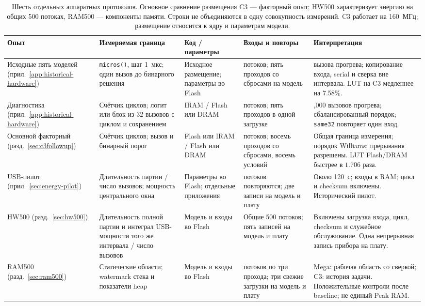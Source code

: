 \begin{table}[!htbp]
\caption{Шесть отдельных аппаратных протоколов. Основное сравнение размещения C3 --- факторный опыт; HW500 характеризует энергию на общих 500 потоках, RAM500 --- компоненты памяти. Строки не объединяются в одну совокупность измерений. C3 работает на 160~МГц; размещение относится к ядру и параметрам модели.}
\label{tab:protocol-map}
\centering\scriptsize\setlength{\tabcolsep}{3pt}
\begin{tabular}{>{\RaggedRight\arraybackslash}p{2.1cm}>{\RaggedRight\arraybackslash}p{3.2cm}>{\RaggedRight\arraybackslash}p{2.4cm}>{\RaggedRight\arraybackslash}p{3.1cm}>{\RaggedRight\arraybackslash}p{4.0cm}}
\toprule
Опыт & Измеряемая граница & Код / параметры & Входы и повторы & Интерпретация\\
\midrule
Исходные пять моделей (прил.~\ref{app:historical-hardware}) & \texttt{micros()}, шаг 1~мкс; один вызов до бинарного решения & Исходное размещение; параметры во Flash & 500 потоков; пять проходов со сбросами на модель & 64 вызова прогрева; копирование входа, serial и сверка вне интервала. LUT на C3 медленнее на 7.58\%.\\
Диагностика (прил.~\ref{app:historical-hardware}) & Счётчик циклов; логит или блок из 32 вызовов с циклом и сохранением & IRAM / Flash или DRAM & 500 потоков; пять проходов в одной загрузке & 2,000 вызовов прогрева; сбалансированный порядок; \texttt{same32} повторяет один вход.\\
Основной факторный (разд.~\ref{sec:c3followup}) & Счётчик циклов; вызов и бинарный порог & Flash или IRAM / Flash или DRAM & 500 потоков; восемь проходов со сбросами, восемь условий & Общая граница измерения; порядок Williams; прерывания разрешены. LUT Flash/DRAM быстрее в $1.706$ раза.\\
USB-пилот (прил.~\ref{sec:energy-pilot}) & Длительность партии / число вызовов; мощность центрального окна & Параметры во Flash; отдельные приложения & 20 потоков повторяются; две записи на модель и плату & Около 120~с; входы в RAM; цикл и checksum включены. Исторический пилот.\\
HW500 (разд.~\ref{sec:hw500}) & Длительность полной партии и интеграл USB-мощности того же интервала / число вызовов & Модель и входы во Flash & Общие 500 потоков; пять записей на модель и плату & Включены загрузка входа, цикл, checksum и служебное обслуживание. Одна непрерывная запись прибора на плату.\\
RAM500 (разд.~\ref{sec:ram500}) & Статические области; watermark стека и показатели heap & Модель и входы во Flash & 500 потоков по три прохода; три свежие загрузки на модель и плату & Mega: рабочая область со сверкой; C3: история задачи. Положительные контроли после baseline; не единый Peak RAM.\\
\bottomrule
\end{tabular}
\end{table}

